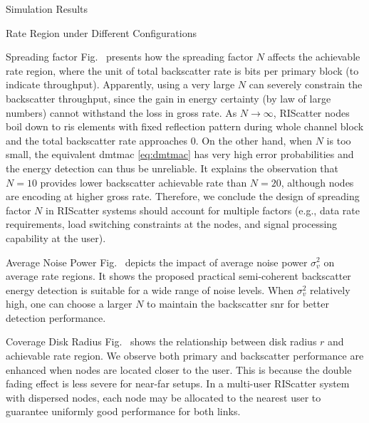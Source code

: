 \documentclass[journal,12pt,onecolumn,draftclsnofoot]{IEEEtran}
\theoremstyle{remark}
\begin{document}
\begin{section}{Simulation Results}
\begin{subsection}{Rate Region under Different Configurations}
		\begin{subsubsection}{Spreading factor}
			Fig.~ presents how the spreading factor $N$ affects the achievable rate region, where the unit of total backscatter rate is bits per primary block (to indicate throughput).
			Apparently, using a very large $N$ can severely constrain the backscatter throughput, since the gain in energy certainty (by law of large numbers) cannot withstand the loss in gross rate.
			As $N \to \infty$, RIScatter nodes boil down to \gls{ris} elements with fixed reflection pattern during whole channel block and the total backscatter rate approaches \num{0}.
			On the other hand, when $N$ is too small, the equivalent \gls{dmtmac} \eqref{eq:dmtmac} has very high error probabilities and the energy detection can thus be unreliable.
			It explains the observation that $N=10$ provides lower backscatter achievable rate than $N=20$, although nodes are encoding at higher gross rate.
			Therefore, we conclude the design of spreading factor $N$ in RIScatter systems should account for multiple factors (e.g., data rate requirements, load switching constraints at the nodes, and signal processing capability at the user).
		\end{subsubsection}

		\begin{subsubsection}{Average Noise Power}
			Fig.~ depicts the impact of average noise power $\sigma_v^2$ on average rate regions.
			It shows the proposed practical semi-coherent backscatter energy detection is suitable for a wide range of noise levels.
			When $\sigma_v^2$ relatively high, one can choose a larger $N$ to maintain the backscatter \gls{snr} for better detection performance.
		\end{subsubsection}

		\begin{subsubsection}{Coverage Disk Radius}
			Fig.~ shows the relationship between disk radius $r$ and achievable rate region.
			We observe both primary and backscatter performance are enhanced when nodes are located closer to the user.
			This is because the double fading effect is less severe for near-far setups.
			In a multi-user RIScatter system with dispersed nodes, each node may be allocated to the nearest user to guarantee uniformly good performance for both links.
		\end{subsubsection}
	\end{subsection}
	\label{st:simulation_results}
\end{section}
\end{document}
